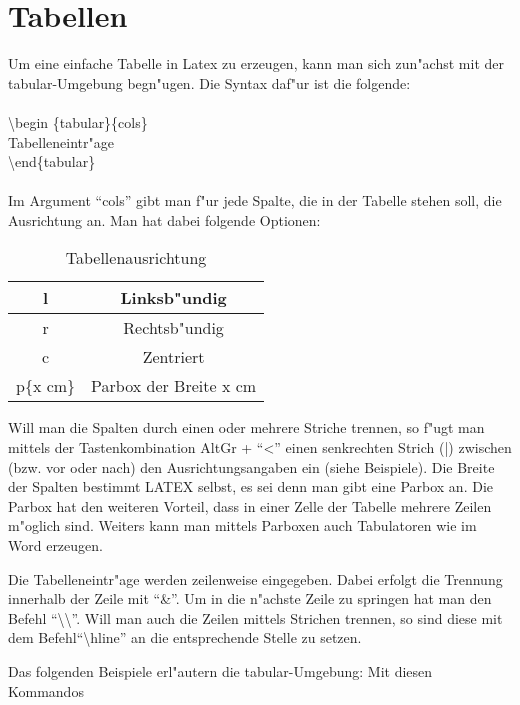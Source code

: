 \chapter{Tabellen}
\label{cha:tabellen}

Um eine einfache Tabelle in Latex zu erzeugen, kann man sich zun"achst mit der tabular-Umgebung begn"ugen. Die Syntax daf"ur ist die folgende: \\
 \\
\textbackslash begin \{tabular\}\{cols\} \\
Tabelleneintr"age \\
\textbackslash end\{tabular\}\\
 \\
Im Argument ``cols'' gibt man f"ur jede Spalte, die in der Tabelle stehen soll, die Ausrichtung 
an. Man hat dabei folgende Optionen: 
 
\begin{table}[htp]
\centering
\begin{tabular}{|c|c|}
\hline
l&Linksb"undig\\
\hline
r&Rechtsb"undig\\
\hline
c&Zentriert\\
\hline
p\{x cm\}&Parbox der Breite x cm\\
\hline
\end{tabular}

\caption{Tabellenausrichtung}
\label{tab:Ausrichtung}
\end{table}

 
Will man die Spalten durch einen oder mehrere Striche trennen, so f"ugt man mittels der 
Tastenkombination AltGr + ``<'' einen senkrechten Strich (|) zwischen (bzw. vor oder nach) 
den Ausrichtungsangaben ein (siehe Beispiele).  
Die Breite der Spalten bestimmt LATEX selbst, es sei denn man gibt eine Parbox an. Die 
Parbox hat den weiteren Vorteil, dass in einer Zelle der Tabelle mehrere Zeilen m"oglich sind. 
Weiters kann man mittels Parboxen auch Tabulatoren wie im Word erzeugen. 
 
Die Tabelleneintr"age werden zeilenweise eingegeben. Dabei erfolgt die Trennung innerhalb 
der Zeile mit ``\&''. Um in die n"achste Zeile zu springen hat man den Befehl ``\textbackslash \textbackslash''. Will man 
auch die Zeilen mittels Strichen trennen, so sind diese mit dem Befehl``\textbackslash hline'' an die 
entsprechende Stelle zu setzen.  
 
Das folgenden Beispiele erl"autern die tabular-Umgebung:  
Mit diesen Kommandos 

